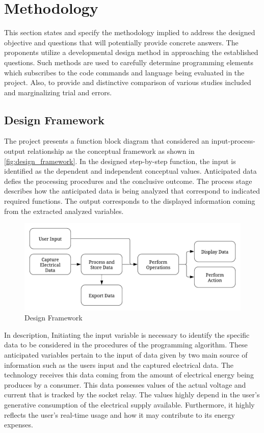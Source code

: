 \documentclass[conference, a4paper]{IEEEtran}
\begin{document}
\section{Methodology}
This section states and specify the methodology implied to address the designed objective and questions that will potentially provide concrete answers. The proponents utilize a developmental design method in approaching the established questions. Such methods are used to carefully determine programming elements which subscribes to the code commands and language being evaluated in the project. Also, to provide and distinctive comparison of various studies included and marginalizing trial and errors.

\subsection{Design Framework}
The project presents a function block diagram that considered an input-process-output relationship as the conceptual framework as shown in \autoref{fig:design_framework}. In the designed step-by-step function, the input is identified as the dependent and independent conceptual values. Anticipated data defies the processing procedures and the conclusive outcome. The process stage describes how the anticipated data is being analyzed that correspond to indicated required functions. The output corresponds to the displayed information coming from the extracted analyzed variables.

\begin{figure}[tbh]
  \centering
  \includegraphics[width=\columnwidth]{img/design_framework.png}
  \caption{Design Framework}
  \label{fig:design_framework}
\end{figure}

In description, Initiating the input variable is necessary to identify the specific data to be considered in the procedures of the programming algorithm. These anticipated variables pertain to the input of data given by two main source of information such as the users input and the captured electrical data. The technology receives this data coming from the amount of electrical energy being produces by a consumer. This data possesses values of the actual voltage and current that is tracked by the socket relay. The values highly depend in the user’s generative consumption of the electrical supply available. Furthermore, it highly reflects the user’s real-time usage and how it may contribute to its energy expenses.
\end{document}
